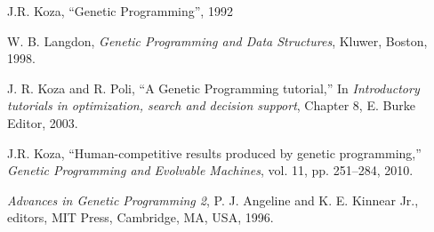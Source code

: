 \begin{thebibliography}{1}
J.R. Koza, ``Genetic Programming'', 1992

%
%

W. B. Langdon, {\em Genetic Programming and Data Structures}, Kluwer, Boston, 1998.

J. R. Koza and R. Poli, ``A Genetic Programming tutorial,'' In {\em Introductory tutorials in optimization, search and
decision support}, Chapter 8, E. Burke Editor, 2003.

J.R. Koza, ``Human-competitive results produced by genetic programming,'' \emph{Genetic Programming and Evolvable Machines}, vol. 11, pp. 251--284, 2010.

 {\em Advances in Genetic Programming 2}, P. J. Angeline and K. E. Kinnear Jr., editors, MIT Press, Cambridge, MA, USA, 1996.




\end{thebibliography}






